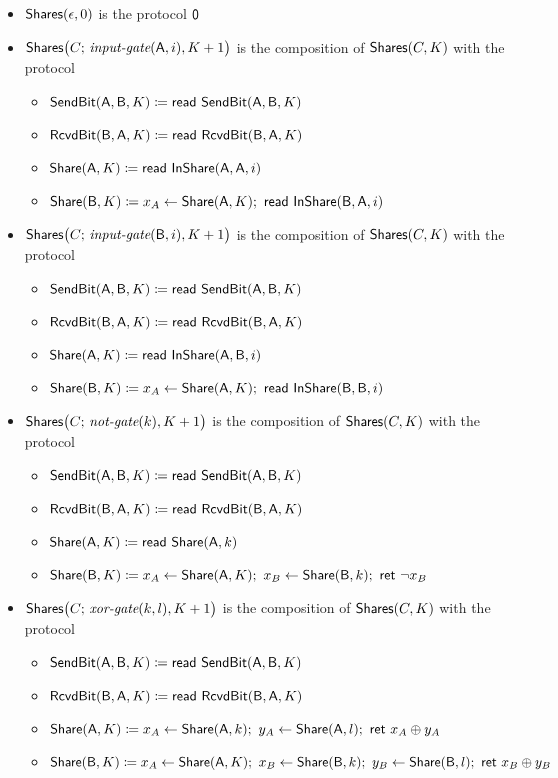 \begin{itemize}
\item $\Shares(\epsilon,0)$ is the protocol $\zero$

\item $\Shares\big(C; \, \inputgate(\A,i),K+1\big)$ is the composition of $\Shares(C,K)$ with the protocol
\begin{itemize}
\item $\SendBit(\A,\B,K) \coloneqq \read{\SendBit(\A,\B,K)}$
\item $\RcvdBit(\B,\A,K) \coloneqq \read{\RcvdBit(\B,\A,K)}$
\item $\Share(\A,K) \coloneqq \read{\InShare(\A,\A,i)}$
\item $\Share(\B,K) \coloneqq x_A \leftarrow \Share(\A,K); \ \read{\InShare(\B,\A,i)}$
\end{itemize}

\item $\Shares\big(C; \, \inputgate(\B,i),K+1\big)$ is the composition of $\Shares(C,K)$ with the protocol
\begin{itemize}
\item $\SendBit(\A,\B,K) \coloneqq \read{\SendBit(\A,\B,K)}$
\item $\RcvdBit(\B,\A,K) \coloneqq \read{\RcvdBit(\B,\A,K)}$
\item $\Share(\A,K) \coloneqq \read{\InShare(\A,\B,i)}$
\item $\Share(\B,K) \coloneqq x_A \leftarrow \Share(\A,K); \ \read{\InShare(\B,\B,i)}$
\end{itemize}

\item $\Shares\big(C; \, \notgate(k),K+1\big)$ is the composition of $\Shares(C,K)$ with the protocol
\begin{itemize}
\item $\SendBit(\A,\B,K) \coloneqq \read{\SendBit(\A,\B,K)}$
\item $\RcvdBit(\B,\A,K) \coloneqq \read{\RcvdBit(\B,\A,K)}$
\item $\Share(\A,K) \coloneqq \read{\Share(\A,k)}$
\item $\Share(\B,K) \coloneqq x_A \leftarrow \Share(\A,K); \ x_B \leftarrow \Share(\B,k); \ \ret{\neg x_B}$
\end{itemize}

\item $\Shares\big(C; \, \xorgate(k,l),K+1\big)$ is the composition of $\Shares(C,K)$ with the protocol
\begin{itemize}
\item $\SendBit(\A,\B,K) \coloneqq \read{\SendBit(\A,\B,K)}$
\item $\RcvdBit(\B,\A,K) \coloneqq \read{\RcvdBit(\B,\A,K)}$
\item $\Share(\A,K) \coloneqq x_A \leftarrow \Share(\A,k); \ y_A \leftarrow \Share(\A,l); \ \ret{x_A \oplus y_A}$
\item $\Share(\B,K) \coloneqq x_A \leftarrow \Share(\A,K); \ x_B \leftarrow \Share(\B,k); \ y_B \leftarrow \Share(\B,l); \ \ret{x_B \oplus y_B}$
\end{itemize}


\end{itemize}
